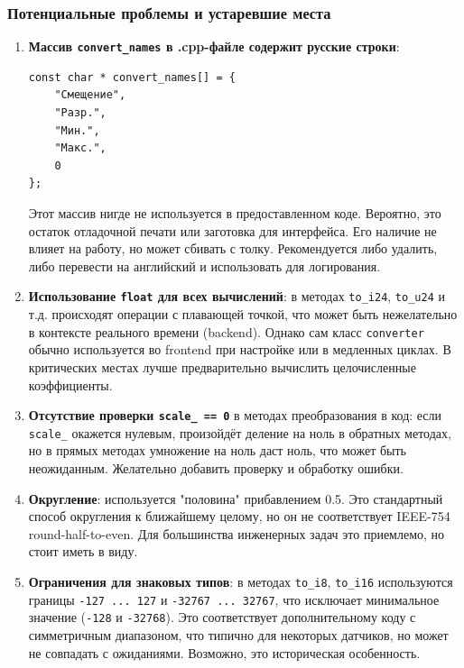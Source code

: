 \documentclass[a4paper,12pt]{article}
\begin{document}
\subsubsection{Потенциальные проблемы и устаревшие места}

\begin{enumerate}
    \item \textbf{Массив \texttt{convert\_names} в .cpp-файле содержит русские строки}: 
\begin{lstlisting}
const char * convert_names[] = {
    "Смещение",
    "Разр.",
    "Мин.",
    "Макс.",
    0
};
\end{lstlisting}
    Этот массив нигде не используется в предоставленном коде. Вероятно, это остаток отладочной печати или заготовка для интерфейса. Его наличие не влияет на работу, но может сбивать с толку. Рекомендуется либо удалить, либо перевести на английский и использовать для логирования.

    \item \textbf{Использование \texttt{float} для всех вычислений}: в методах \texttt{to\_i24}, \texttt{to\_u24} и т.д. происходят операции с плавающей точкой, что может быть нежелательно в контексте реального времени (backend). Однако сам класс \texttt{converter} обычно используется во frontend при настройке или в медленных циклах. В критических местах лучше предварительно вычислить целочисленные коэффициенты.

    \item \textbf{Отсутствие проверки \texttt{scale\_ == 0}} в методах преобразования в код: если \texttt{scale\_} окажется нулевым, произойдёт деление на ноль в обратных методах, но в прямых методах умножение на ноль даст ноль, что может быть неожиданным. Желательно добавить проверку и обработку ошибки.

    \item \textbf{Округление}: используется "половина" прибавлением 0.5. Это стандартный способ округления к ближайшему целому, но он не соответствует IEEE-754 round-half-to-even. Для большинства инженерных задач это приемлемо, но стоит иметь в виду.

    \item \textbf{Ограничения для знаковых типов}: в методах \texttt{to\_i8}, \texttt{to\_i16} используются границы \texttt{-127 ... 127} и \texttt{-32767 ... 32767}, что исключает минимальное значение (\texttt{-128} и \texttt{-32768}). Это соответствует дополнительному коду с симметричным диапазоном, что типично для некоторых датчиков, но может не совпадать с ожиданиями. Возможно, это историческая особенность.


\end{enumerate}
\end{document}
